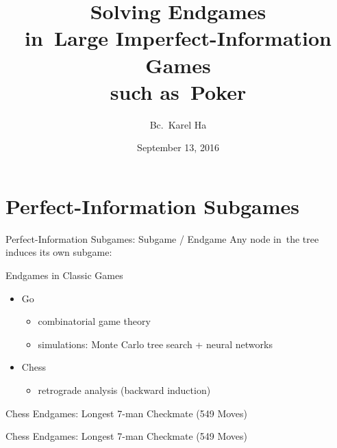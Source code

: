 \documentclass{beamer}
\title{Solving Endgames \\in~Large Imperfect-Information Games \\such as~Poker}
\date{September 13, 2016}
\author{Bc.~Karel Ha}
\institute{Department of~Applied Mathematics \\Charles University}
\theoremstyle{definition}
\begin{document}
  \maketitle


  \section{Perfect-Information Subgames}

  \begin{frame}{Perfect-Information Subgames: Subgame / Endgame}
    Any node in~the tree induces its own subgame:
    \pause
    \begin{figure}[H]
      \raggedleft
      \scriptsize
      \def\svgwidth{.8\textwidth}
      
    \end{figure}
  \end{frame}

  \begin{frame}{Endgames in Classic Games}
    \pause
    \begin{itemize}[<+- | alert@+>]
      \item Go
        \begin{itemize}
          \item combinatorial game theory
          \item simulations: Monte Carlo tree search + neural networks
        \end{itemize}
      \item Chess
        \begin{itemize}
          \item retrograde analysis (backward induction)
        \end{itemize}
    \end{itemize}
  \end{frame}

  \def\chessTitle{Chess Endgames: Longest 7-man Checkmate }
  \begin{frame}{\chessTitle (549 Moves)}
    \begin{figure}[H]
      \centering
      \newgame
      \showboard
    \end{figure}
  \end{frame}

  \begin{frame}{\chessTitle (549 Moves)}
    \begin{figure}[H]
      \centering
      \showboard
    \end{figure}
  \end{frame}
\end{document}
